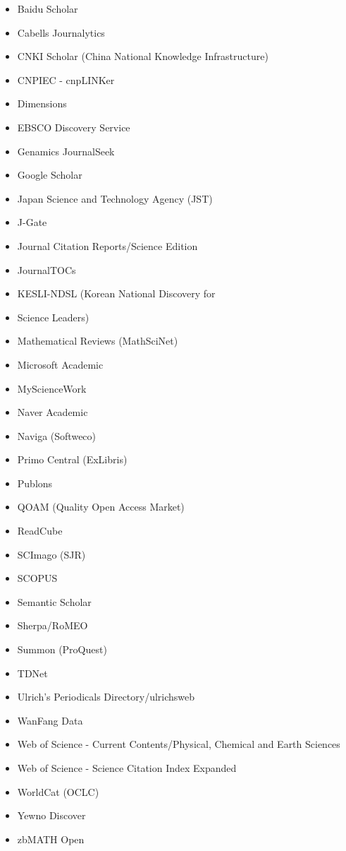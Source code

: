 \documentclass{book}
\numberwithin{equation}{section}
\begin{document}
\begin{itemize}
    \item Baidu Scholar
    \item Cabells Journalytics
    \item CNKI Scholar (China National Knowledge Infrastructure)
    \item CNPIEC - cnpLINKer
    \item Dimensions
    \item EBSCO Discovery Service
    \item Genamics JournalSeek
    \item Google Scholar
    \item Japan Science and Technology Agency (JST)
    \item J-Gate
    \item Journal Citation Reports/Science Edition
    \item JournalTOCs
    \item KESLI-NDSL (Korean National Discovery for \item Science Leaders)
    \item Mathematical Reviews (MathSciNet)
    \item Microsoft Academic
    \item MyScienceWork
    \item Naver Academic
    \item Naviga (Softweco)
    \item Primo Central (ExLibris)
    \item Publons
    \item QOAM (Quality Open Access Market)
    \item ReadCube
    \item SCImago (SJR)
    \item SCOPUS
    \item Semantic Scholar
    \item Sherpa/RoMEO
    \item Summon (ProQuest)
    \item TDNet
    \item Ulrich's Periodicals Directory/ulrichsweb
    \item WanFang Data
    \item Web of Science - Current Contents/Physical, Chemical and Earth Sciences
    \item Web of Science - Science Citation Index Expanded
    \item WorldCat (OCLC)
    \item Yewno Discover
    \item zbMATH Open
\end{itemize}
\end{document}

